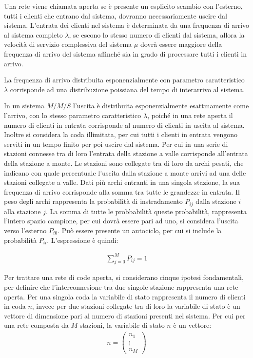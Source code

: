 \documentclass{article}
\numberwithin{equation}{subsection}
\begin{document}
Una rete viene chiamata aperta se è presente un esplicito scambio con l'esterno, tutti i clienti che entrano dal sistema, dovranno necessariamente uscire dal sistema. 
L'entrata dei clienti nel sistema è determinata da una frequenza di arrivo al sistema completo $\lambda$, se escono lo stesso numero di clienti dal sistema, allora 
la velocità di servizio complessiva del sistema $\mu$ dovrà essere maggiore della frequenza di arrivo del sistema affinché sia in grado di processare tutti i clienti in 
arrivo.  

La frequenza di arrivo distribuita esponenzialmente con parametro caratteristico $\lambda$ corrisponde ad una distribuzione poissiana del tempo di interarrivo al 
sistema. 


In un sistema $M/M/S$ l'uscita è distribuita esponenzialmente esattmamente come l'arrivo, con lo stesso parametro caratteristico $\lambda$, poiché in una rete aperta 
il numero di clienti in entrata corrisponde al numero di clienti in uscita al sistema. Inoltre si considera la coda illimitata, per cui tutti i clienti in entrata vengono 
serviti in un tempo finito per poi uscire dal sistema. 
Per cui in una serie di stazioni connesse tra di loro l'entrata della stazione a valle corrisponde all'entrata della stazione a monte. Le stazioni sono collegate tra di loro 
da archi pesati, che indicano con quale percentuale l'uscita dalla stazione a monte arrivi ad una delle stazioni collegate a valle. 
Dati più archi entranti in una singola stazione, la sua frequenza di arrivo corrisponde alla somma tra tutte le grandezze in entrata. 
Il peso degli archi rappresenta la probabilità di instradamento $P_{ij}$ dalla stazione $i$ alla stazione $j$. La somma di tutte le probbabilità queste probabilità, rappresenta 
l'intero spazio campione, per cui dovrà essere pari ad uno, si considera l'uscita verso l'esterno $P_{i0}$. Può essere presente un autociclo, per cui si include la probabilità 
$P_{ii}$. L'espressione è quindi: 

\begin{gather}
    \displaystyle\sum_{j=0}^{M}P_{ij}=1
\end{gather} 

Per trattare una rete di code aperta, si considerano cinque ipotesi fondamentali, per definire che l'interconnesione tra due singole stazione rappresenta una rete aperta. Per 
una singola coda la variabile di stato rappresenta il numero di clienti in coda $n$, invece per due stazioni collegate tra di loro la variabile di stato è un vettore di 
dimensione pari al numero di stazioni presenti nel sistema. Per cui per una rete composta da $M$ stazioni, la variabile di stato $n$ è un vettore:
\begin{gather}
    n=\begin{pmatrix}
       n_1\\
       \vdots\\
       n_M 
    \end{pmatrix}
\end{gather}
\end{document}
